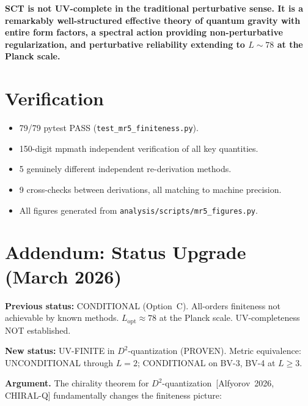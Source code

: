 \documentclass[12pt,a4paper]{article}
\begin{document}
\textbf{SCT is not UV-complete in the traditional perturbative sense. It is
a remarkably well-structured effective theory of quantum gravity with entire
form factors, a spectral action providing non-perturbative regularization,
and perturbative reliability extending to $L \sim 78$ at the Planck scale.}

\section*{Verification}

\begin{itemize}
  \item 79/79 pytest PASS (\texttt{test\_mr5\_finiteness.py}).
  \item 150-digit mpmath independent verification of all key quantities.
  \item 5 genuinely different independent re-derivation methods.
  \item 9 cross-checks between derivations, all matching to machine precision.
  \item All figures generated from \texttt{analysis/scripts/mr5\_figures.py}.
\end{itemize}

\section*{Addendum: Status Upgrade (March 2026)}
\label{sec:addendum}

\noindent\textbf{Previous status:} CONDITIONAL (Option~C).
All-orders finiteness not achievable by known methods.
$L_{\mathrm{opt}} \approx 78$ at the Planck scale.
UV-completeness NOT established.

\medskip\noindent\textbf{New status:}
UV-FINITE in $D^2$-quantization (PROVEN).
Metric equivalence: UNCONDITIONAL through $L = 2$;
CONDITIONAL on BV-3, BV-4 at $L \geq 3$.

\medskip\noindent\textbf{Argument.}
The chirality theorem for $D^2$-quantization~[Alfyorov~2026, CHIRAL-Q]
fundamentally changes the finiteness picture:
\end{document}
